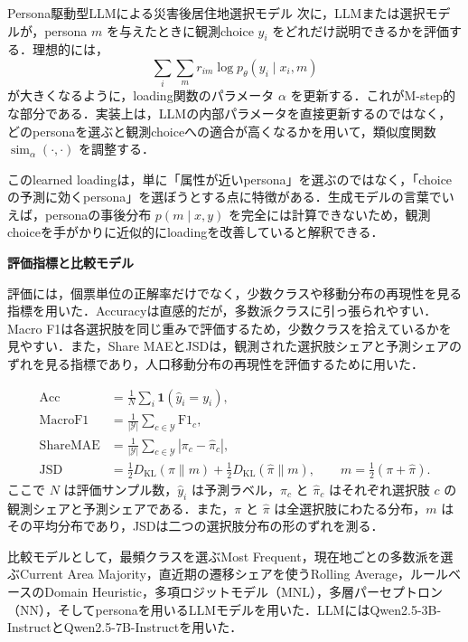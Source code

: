 \begin{column}{Persona駆動型LLMによる災害後居住地選択モデル}
次に，LLMまたは選択モデルが，persona \(m\) を与えたときに観測choice \(y_i\) をどれだけ説明できるかを評価する．理想的には，
\begin{equation}
\sum_i \sum_m r_{im}\log p_\theta(y_i\mid x_i,m)
\end{equation}
が大きくなるように，loading関数のパラメータ \(\alpha\) を更新する．これがM-step的な部分である．実装上は，LLMの内部パラメータを直接更新するのではなく，どのpersonaを選ぶと観測choiceへの適合が高くなるかを用いて，類似度関数 \(\operatorname{sim}_\alpha(\cdot,\cdot)\) を調整する．

このlearned loadingは，単に「属性が近いpersona」を選ぶのではなく，「choiceの予測に効くpersona」を選ぼうとする点に特徴がある．生成モデルの言葉でいえば，personaの事後分布 \(p(m\mid x,y)\) を完全には計算できないため，観測choiceを手がかりに近似的にloadingを改善していると解釈できる．

\medskip
\noindent
\textbf{評価指標と比較モデル}

評価には，個票単位の正解率だけでなく，少数クラスや移動分布の再現性を見る指標を用いた．Accuracyは直感的だが，多数派クラスに引っ張られやすい．Macro F1は各選択肢を同じ重みで評価するため，少数クラスを拾えているかを見やすい．また，Share MAEとJSDは，観測された選択肢シェアと予測シェアのずれを見る指標であり，人口移動分布の再現性を評価するために用いた．

\begin{align}
\mathrm{Acc}
&=
\frac{1}{N}\sum_i \mathbf{1}(\hat{y}_i=y_i),\\
\mathrm{MacroF1}
&=
\frac{1}{|\mathcal{Y}|}\sum_{c\in\mathcal{Y}}\mathrm{F1}_c,\\
\mathrm{ShareMAE}
&=
\frac{1}{|\mathcal{Y}|}\sum_{c\in\mathcal{Y}}|\pi_c-\hat{\pi}_c|,\\
\mathrm{JSD}
&=
\frac{1}{2}D_{\mathrm{KL}}(\pi\|m)
+
\frac{1}{2}D_{\mathrm{KL}}(\hat{\pi}\|m),
\qquad
m=\frac{1}{2}(\pi+\hat{\pi}).
\end{align}
ここで \(N\) は評価サンプル数，\(\hat{y}_i\) は予測ラベル，\(\pi_c\) と \(\hat{\pi}_c\) はそれぞれ選択肢 \(c\) の観測シェアと予測シェアである．また，\(\pi\) と \(\hat{\pi}\) は全選択肢にわたる分布，\(m\) はその平均分布であり，JSDは二つの選択肢分布の形のずれを測る．

比較モデルとして，最頻クラスを選ぶMost Frequent，現在地ごとの多数派を選ぶCurrent Area Majority，直近期の遷移シェアを使うRolling Average，ルールベースのDomain Heuristic，多項ロジットモデル（MNL），多層パーセプトロン（NN），そしてpersonaを用いるLLMモデルを用いた．LLMにはQwen2.5-3B-InstructとQwen2.5-7B-Instructを用いた．


\end{column}
